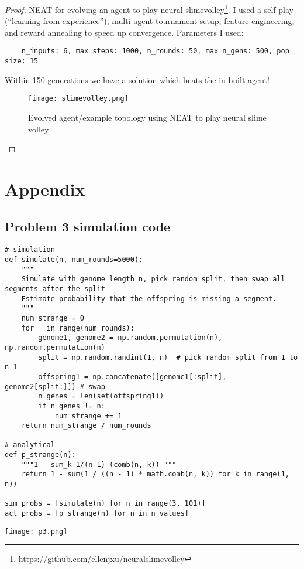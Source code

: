 \documentclass[12pt]{article}
\begin{document}
\begin{proof}
NEAT for evolving an agent to play neural slimevolley\footnote{\url{https://github.com/ellenjxu/neuralslimevolley}}. I used a self-play (``learning from experience''), multi-agent tournament setup, feature engineering, and reward annealing to speed up convergence. Parameters I used:
\begin{verbatim}
    n_inputs: 6, max steps: 1000, n_rounds: 50, max n_gens: 500, pop size: 15
\end{verbatim}

Within 150 generations we have a solution which beats the in-built agent!

\begin{figure}
    \centering
    \texttt{[image: slimevolley.png]}
    \caption{Evolved agent/example topology using NEAT to play neural slime volley}
    \label{fig:enter-label}
\end{figure}

\end{proof}

\newpage
\section{Appendix}
\subsection{Problem 3 simulation code}

\begin{lstlisting}
# simulation
def simulate(n, num_rounds=5000):
    """
    Simulate with genome length n, pick random split, then swap all segments after the split
    Estimate probability that the offspring is missing a segment.
    """
    num_strange = 0
    for _ in range(num_rounds):
        genome1, genome2 = np.random.permutation(n), np.random.permutation(n)
        split = np.random.randint(1, n)  # pick random split from 1 to n-1
        offspring1 = np.concatenate([genome1[:split], genome2[split:]]) # swap
        n_genes = len(set(offspring1)) 
        if n_genes != n:
            num_strange += 1
    return num_strange / num_rounds

# analytical
def p_strange(n):
    """1 - sum_k 1/(n-1) (comb(n, k)) """
    return 1 - sum(1 / ((n - 1) * math.comb(n, k)) for k in range(1, n))

sim_probs = [simulate(n) for n in range(3, 101)]
act_probs = [p_strange(n) for n in n_values]

\end{lstlisting}

\begin{minipage}{\textwidth}
    \centering
    \texttt{[image: p3.png]}
\end{minipage}

 
\end{document}
